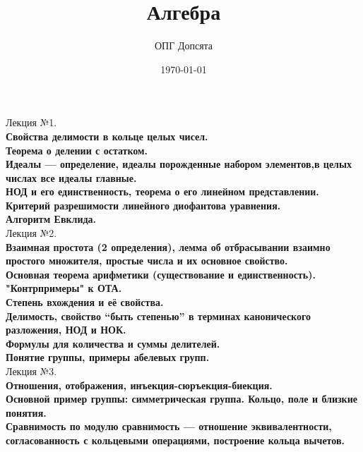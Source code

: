 \documentclass[12pt]{article}
\title{Алгебра}
\author{ОПГ Допсята}
\date{\today}
\begin{document}
\maketitle
\large

Лекция №1.\\
\textbf{Свойства делимости в кольце целых чисел.}\\

\textbf{Теорема о делении с остатком.}\\

\textbf{Идеалы — определение, идеалы порожденные набором элементов,в целых числах все идеалы главные.}\\

\textbf{НОД и его единственность, теорема о его линейном представлении.}\\

\textbf{Критерий разрешимости линейного диофантова уравнения.}\\

\textbf{Алгоритм Евклида.}\\

Лекция №2.\\
\textbf{Взаимная простота (2 определения), лемма об отбрасывании взаимно простого множителя, простые числа и их основное свойство.}\\

\textbf{Основная теорема арифметики (существование и единственность).
"Контрпримеры" к ОТА.}\\

\textbf{Степень вхождения и её свойства.}\\

\textbf{Делимость, свойство “быть степенью” в терминах канонического разложения, НОД и НОК.}\\

\textbf{Формулы для количества и суммы делителей.}\\

\textbf{Понятие группы, примеры абелевых групп.}\\

Лекция №3.\\
\textbf{Отношения, отображения, инъекция-сюръекция-биекция.}\\

\textbf{Основной пример группы: симметрическая группа. Кольцо, поле и близкие понятия.}\\

\textbf{Сравнимость по модулю сравнимость — отношение эквивалентности, согласованность с кольцевыми операциями, построение кольца вычетов.}\\
\end{document}
